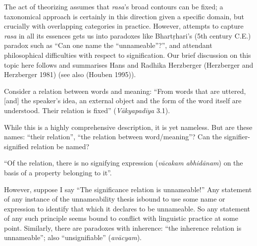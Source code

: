 The act of theorizing assumes that \textsl{rasa}’s broad contours can be fixed; a taxonomical approach is certainly in this direction given a specific domain, but crucially with overlapping categories in practice. However, attempts to capture \textsl{rasa} in all its essences gets us into paradoxes like Bhartṛhari's (5th century C.E.) paradox such as “Can one name the “unnameable”?”, and attendant philosophical difficulties with respect to signification. Our brief discussion on this topic here follows and summarises Hans and Radhika Herzberger (Herzberger and Herzberger 1981) (see also (Houben 1995)).

\begin{normalmyquote}
Consider a relation between words and meaning: “From words that are uttered, [and] the speaker's idea, an external object and the form of the word itself are understood. Their relation is fixed” (\textsl{Vākyapadīya} 3.1). 
\eject

While this is a highly comprehensive description, it is yet nameless. But are these names: “their relation”, “the relation between word/meaning”? Can the signifier-signified relation be named? 

“Of the relation, there is no signifying expression (\textsl{vācakam abhidānam}) on the basis of a property belonging to it”. 

However, suppose I say “The significance relation is unnameable!” Any statement of any instance of the unnameability thesis is\break bound to use some name or expression to identify that which it declares to be unnameable. So any statement of any such principle seems bound to conflict with linguistic practice at some point. Similarly, there are paradoxes with inherence: “the inherence relation is unnameable”; also “unsignifiable” (\textsl{avācyam}).
\end{normalmyquote}

